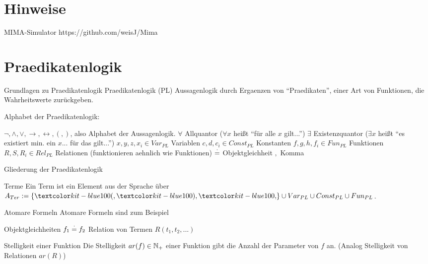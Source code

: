 \documentclass[]{beamer}
\begin{document}

\begin{frame}
	\titlepage
\end{frame}

\section{Hinweise}

\begin{frame} {MIMA-Simulator}
https://github.com/weisJ/Mima
\end{frame}

\section{Praedikatenlogik}
\begin{frame}{Grundlagen zu Praedikatenlogik}
	Praedikatenlogik (PL) \ip {} Aussagenlogik durch Ergaenzen von ``Praedikaten'', einer Art von Funktionen, die Wahrheitswerte zurückgeben.

	Alphabet der Praedikatenlogik:
	
	\begin{itemize}
		\pitem $\lnot, \land, \lor, \rightarrow, \leftrightarrow, (, )$, also Alphabet der Aussagenlogik.
		\pitem $\forall$ Allquantor \ip ($\forall x$ heißt ``für alle $x$ gilt...'')
		\pitem $\exists$ Existenzquantor \ip ($\exists x$ heißt ``es existiert min. ein $x$... für das gilt...'')
		\pitem $x,y,z,x_i \in Var_{PL}$ Variablen
		\pitem $c, d, c_i \in Const_{PL}$ Konstanten
		\pitem $f, g, h, f_i \in Fun_{PL}$ Funktionen 
		\pitem $R, S, R_i \in Rel_{PL}$ Relationen (funktionieren aehnlich wie Funktionen)
		\pitem $\stackrel{\cdot}{=}$ Objektgleichheit
		\pitem $,$ Komma
	\end{itemize}
\end{frame}

\begin{frame}{Gliederung der Praedikatenlogik}
	\begin{block}{Terme}
		Ein Term ist ein Element aus der Sprache über $A_{Ter} := \{\markBlue{(}, \markBlue{)}, \markBlue{,}\} \cup Var_{PL} \cup Const_{PL} \cup Fun_{PL}$.
	\end{block}
	
	\begin{block}{Atomare Formeln}
		Atomare Formeln sind zum Beispiel
		\begin{itemize}
			\pitem Objektgleichheiten $f_1 \stackrel{\cdot}{=} f_2$
			\pitem Relation von Termen $R(t_1, t_2, ...)$
		\end{itemize}
	\end{block}

	\begin{block}{Stelligkeit einer Funktion}
		Die Stelligkeit $ar(f) \in \mathbb{N}_+$ einer Funktion gibt die Anzahl der Parameter von $f$ an. \ip (Analog Stelligkeit von Relationen $ar(R)$)
	\end{block}
	
\end{frame}
\end{document}
